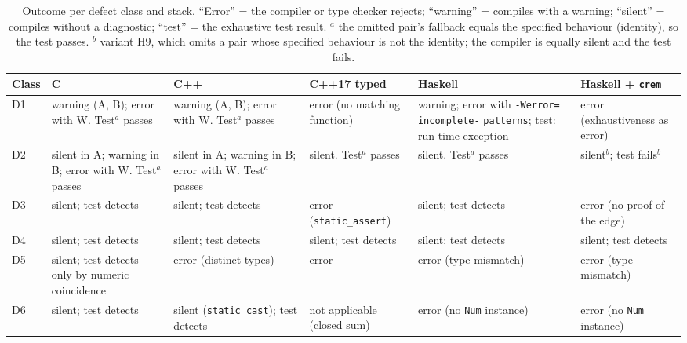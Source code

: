\documentclass[review,12pt]{elsarticle}
\newcommand{\code}[1]{\texttt{#1}}
\newcommand{\crem}{\texttt{crem}}
\begin{document}
\begin{table}[!t]
\caption{Outcome per defect class and stack. ``Error'' = the compiler or type checker rejects; ``warning'' = compiles with a warning; ``silent'' = compiles without a diagnostic; ``test'' = the exhaustive test result. $^{a}$ the omitted pair's fallback equals the specified behaviour (identity), so the test passes. $^{b}$ variant H9, which omits a pair whose specified behaviour is not the identity; the compiler is equally silent and the test fails.}
\label{tab:results}
\centering
\scriptsize
\begin{tabular}{@{}p{1.0cm}p{2.0cm}p{2.0cm}p{2.0cm}p{2.0cm}p{2.0cm}@{}}
\toprule
Class & C & C++ & C++17 typed & Haskell & Haskell + \crem{} \\
\midrule
D1 & warning (A, B); error with W. Test$^{a}$ passes & warning (A, B); error with W. Test$^{a}$ passes & error (no matching function) & warning; error with \code{-Werror=} \code{incomplete-} \code{patterns}; test: run-time exception & error (exhaustiveness as error) \\
D2 & silent in A; warning in B; error with W. Test$^{a}$ passes & silent in A; warning in B; error with W. Test$^{a}$ passes & silent. Test$^{a}$ passes & silent. Test$^{a}$ passes & silent$^{b}$; test fails$^{b}$ \\
D3 & silent; test detects & silent; test detects & error (\code{static\_}\allowbreak\code{assert}) & silent; test detects & error (no proof of the edge) \\
D4 & silent; test detects & silent; test detects & silent; test detects & silent; test detects & silent; test detects \\
D5 & silent; test detects only by numeric coincidence & error (distinct types) & error & error (type mismatch) & error (type mismatch) \\
D6 & silent; test detects & silent (\code{static\_cast}); test detects & not applicable (closed sum) & error (no \code{Num} instance) & error (no \code{Num} instance) \\
\bottomrule
\end{tabular}
\end{table}
\end{document}
